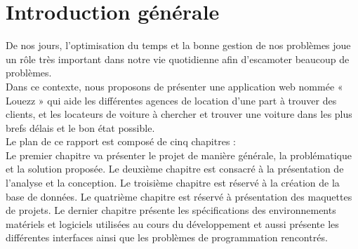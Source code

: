 \chapter*{Introduction générale}




\begin{onehalfspace}
\large{	 De nos jours, l’optimisation du temps et la bonne gestion de nos problèmes joue un rôle très important dans notre vie quotidienne afin d’escamoter beaucoup de problèmes.\\
	 
	 Dans ce contexte, nous proposons de présenter une application web nommée « Louezz » qui aide les différentes agences de location d’une part à trouver des clients, et les locateurs de voiture à chercher et trouver une voiture dans les plus brefs délais et le bon état possible.\\
	 
	 Le plan de ce rapport est composé de cinq chapitres :\\
	 
	 Le premier chapitre va présenter le projet de manière générale, la problématique et la solution proposée. Le deuxième chapitre est consacré à la présentation de l'analyse et la conception. Le troisième chapitre est réservé à la création de la base de données. Le quatrième chapitre est réservé à présentation des maquettes de projets. Le dernier chapitre présente les spécifications des environnements matériels et logiciels utilisées au cours du développement et aussi présente les différentes interfaces ainsi que les problèmes de programmation rencontrés.}
\end{onehalfspace}




